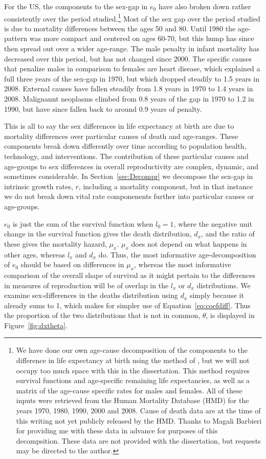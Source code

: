 For the US, the components to the sex-gap in $e_0$ have also broken down rather
consistently over the period studied.\footnote{We have done our own age-cause
decomposition of the components to the difference in life expectancy at birth using the method of
\citet{andreev2002algorithm}, but we will not occupy too much space with this
in the dissertation. This method requires survival functions and age-specific
remaining life expectancies, as well as a matrix of the age-cause specific 
rates for males and females. All of these inputs were retrieved from
the Human Mortality Database (HMD) for the years 1970, 1980, 1990, 2000 and
2008. Cause of death data are at the time of this writing not yet publicly released by the HMD. Thanks 
to Magali Barbieri for providing me with these data in advance for
purposes of this decompsition. These data are not provided with the
dissertation, but requests may be directed to the author.} Most of the sex gap
over the period studied is due to mortality differences between the ages 50 
and 80. Until 1980 the age-pattern was more compact and centered on ages 60-70, but this hump has since
then spread out over a wider age-range. The male penalty in infant
mortality has decreased over this period, but has not changed since
2000. The specific causes that penalize males in comparison to females are 
heart disease, which explained a full three
years of the sex-gap in 1970, but which dropped steadily to 1.5 years in 2008.
External causes have fallen steadily from 1.8 years in 1970 to 1.4 years in
2008. Malignannt neoplasms climbed from 0.8 years of the gap in 1970 to 1.2 in
1990, but have since fallen back to around 0.9 years of penalty. 

This is all to say the sex differences in life expectancy at birth are due to
mortality differences over particular causes of death and age-ranges. These
components break down differently over time according to population health,
technology, and interventions. The contribution of these particular causes and
age-groups to sex differences in overall reproductivity are complex, dynamic,
and sometimes considerable. In Section~\ref{sec:Decompr} we decompose the
sex-gap in intrinsic growth rates, $r$, including a mortality component, but 
in that instance we do not break down vital rate componenents further into
particular causes or age-groups.

$e_0$ is just the sum of the survival function when $l_0 = 1$, where the
negative unit change in the survival function gives the death distribution,
$d_x$, and the ratio of these gives the mortality hazard, $\mu _x$. $\mu_x$ does
not depend on what happens in other ages, whereas $l_x$ and $d_x$ do. Thus, the
most informative age-decomposition of $e_0$ should be based on differences in
$\mu _x$, whereas the most informative comparison of the overall shape of
survival as it might pertain to the differences in measures of reproduction
will be of overlap in the $l_x$ or $d_x$ distributions. We examine
sex-differences in the deaths distribution using $d_x$ simply
because it already sums to 1, which makes for simpler use of
Equation~\eqref{eq:coefdiff}. Thus the proportion of the two distributions that
is not in common, $\theta$, is displayed in Figure~\ref{fig:dxtheta}.

